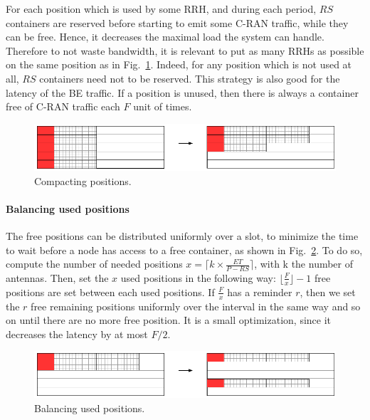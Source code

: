\documentclass[10pt, conference, letterpaper]{IEEEtran}
\begin{document}
For each position which is used by some RRH, and during each period, $RS$ containers are reserved before starting to emit some C-RAN traffic, while they can be free. Hence, it decreases the maximal load the system can handle.
Therefore to not waste bandwidth, it is relevant to put as many RRHs as possible on the same position as in Fig.~\ref{fig:packing}. Indeed, for any position which is not used at all, $RS$ containers need not to be reserved. This strategy is also good for the latency of the BE traffic. If a position is unused, then there is always a container free of C-RAN traffic each $F$ unit of times. 
\begin{figure}[h!]
\begin{center}   

      \includegraphics[scale=0.5]{repart0}
     \caption{Compacting positions.}\label{fig:packing}
     
\end{center}
  \end{figure}
  

\paragraph{Balancing used positions}

The free positions can be distributed uniformly over a slot, to minimize the time to wait before a node 
has access to a free container, as shown in Fig.~\ref{fig:slotbal}. To do so, compute the number of needed positions $x = \lceil k\times \frac{ET}{P - RS}\rceil$, with k the number of antennas. Then, set the $x$ used positions in the following way: $\lfloor\frac{F}{x}\rfloor -1 $ free positions are set between each used positions. If $\frac{F}{x}$ has a reminder $r$, then we set the $r$ free remaining positions uniformly over the interval in the same way and so on until there are no more free position. It is a small optimization, since it decreases the latency by at most $F/2$.

\begin{figure}[h!]
\begin{center}   

      \includegraphics[scale=0.55]{repart1}
     \caption{Balancing used positions.}\label{fig:slotbal}
     
\end{center}
  \end{figure}
\end{document}
